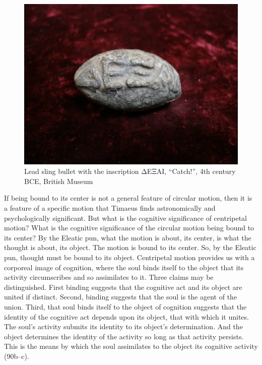 \begin{figure}[htbp]
	\centering
		\includegraphics[scale=0.3]{graphics/dexai.jpg}
	\caption{Lead sling bullet with the inscription {\sbl ΔΕΞΑΙ}, ``Catch!'', 4th century BCE, British Museum}
	\label{fig:dexai}
\end{figure}

If being bound to its center is not a general feature of circular motion, then it is a feature of a specific motion that Timaeus finds astronomically and psychologically significant. But what is the cognitive significance of centripetal motion? What is the cognitive significance of the circular motion being bound to its center? By the Eleatic pun, what the motion is about, its center, is what the thought is about, its object. The motion is bound to its center. So, by the Eleatic pun, thought must be bound to its object. Centripetal motion provides us with a corporeal image of cognition, where the soul binds itself to the object that its activity circumscribes and so assimilates to it. Three claims may be distinguished. First binding suggests that the cognitive act and its object are united if distinct. Second, binding suggests that the soul is the agent of the union. Third, that soul binds itself to the object of cognition suggests that the identity of the cognitive act depends upon its object, that with which it unites. The soul's activity submits its identity to its object's determination. And the object determines the identity of the activity so long as that activity persists. This is the means by which the soul assimilates to the object its cognitive activity (90b--c).

